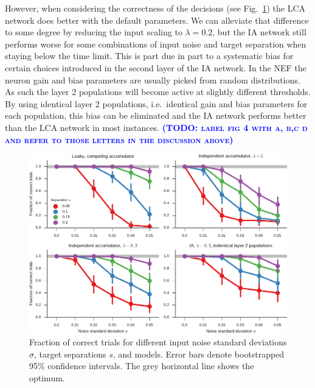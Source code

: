\documentclass[10pt,letterpaper]{article}
\makeatletter
\newcommand{\todo}[1]{\textbf{\textsc{\textcolor{blue}{(TODO\@: #1)}}}}
\makeatother
\begin{document}
However, when considering the correctness of the decisions (see Fig.~\ref{fig:correct}) the LCA network does better with the default parameters.
We can alleviate that difference to some degree by reducing the input scaling to $\lambda = 0.2$, but the IA network still performs worse for some combinations of input noise and target separation when staying below the time limit.
This is part due in part to a systematic bias for certain choices introduced in the second layer of the IA network.
In the NEF the neuron gain and bias parameters are usually picked from random distributions.
As such the layer 2 populations will become active at slightly different thresholds.
By using identical layer 2 populations, i.e.~identical gain and bias parameters for each population, this bias can be eliminated and the IA network performs better than the LCA network in most instances.
\todo{label fig 4 with a, b,c d and refer to those letters in the discussion above}
\begin{figure}
    \centering
    \includegraphics{figures/correct}
    \caption{ \label{fig:correct}
        Fraction of correct trials for different input noise standard deviations $\sigma$, target separations $s$, and models.  
        Error bars denote bootstrapped 95\% confidence intervals.
        The grey horizontal line shows the optimum.
    }
\end{figure}
\end{document}
